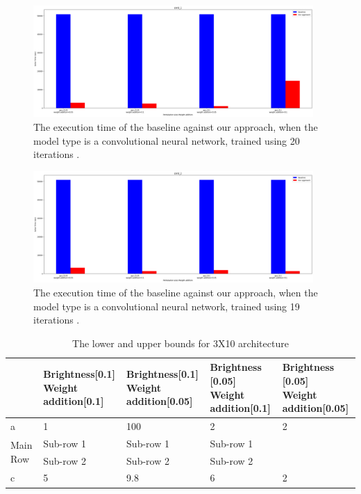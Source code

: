 \begin{figure}[ht]
  \centering
  \includegraphics[width=0.95\textwidth]{cnn0_1.png}
  \caption{The execution time of the baseline against our approach, when the model type is a convolutional neural network, trained using 20 iterations .}
  \label{fig:cnn0_1}
\end{figure}

\begin{figure}[ht]
  \centering
  \includegraphics[width=0.95\textwidth]{cnn0_2.png}
  \caption{The execution time of the baseline against our approach, when the model type is a convolutional neural network, trained using 19 iterations .}
  \label{fig:cnn0_2}
\end{figure}

\begin{table}[H]
	\centering
	\caption{The lower and upper bounds for 3X10 architecture 
		\label{tabLabel}}
	\begin{tabular}{@{\extracolsep{\fill}}lllll@{}}
		\toprule
		& \makecell{Brightness[0.1] \\ Weight addition[0.1]} & \makecell{Brightness[0.1] \\ Weight addition[0.05]} & \makecell{Brightness [0.05] \\ Weight addition[0.1]} & \makecell{Brightness [0.05] \\ Weight addition[0.05]}\\
		\midrule			
		a&1& 100& 2& 2\\
		\midrule
		\multirow{2}{*}{Main Row} & Sub-row 1 & Sub-row 1 & Sub-row 1 \\
                              & Sub-row 2 & Sub-row 2 & Sub-row 2 \\
		\midrule
		c&5& 9.8& 6& 2\\							
		\bottomrule
	\end{tabular}
\end{table}


